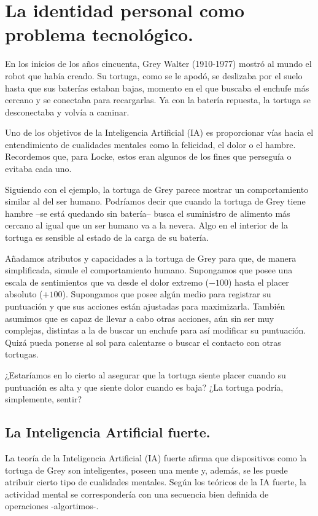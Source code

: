\documentclass[main.tex]{subfiles}
\begin{document}
\chapter{La identidad personal como problema tecnológico.}


En los inicios de los años cincuenta, Grey Walter (1910-1977) mostró al mundo el robot que había creado. Su tortuga, como se le apodó, se deslizaba por el suelo hasta que sus baterías estaban bajas, momento en el que buscaba el enchufe más cercano y se conectaba para recargarlas. Ya con la batería repuesta, la tortuga se desconectaba y volvía a caminar. 

Uno de los objetivos de la Inteligencia Artificial (IA) es proporcionar vías hacia el entendimiento de cualidades mentales como la felicidad, el dolor o el hambre. Recordemos que, para Locke, estos eran algunos de los fines que perseguía o evitaba cada uno.

Siguiendo con el ejemplo, la tortuga de Grey parece mostrar un comportamiento similar al del ser humano. Podríamos decir que  cuando la tortuga de Grey tiene hambre –se está quedando sin batería– busca el suministro de alimento más cercano al igual que un ser humano va a la nevera. Algo en el interior de la tortuga es sensible al estado de la carga de su batería.


Añadamos atributos y capacidades a la tortuga de Grey para que, de manera simplificada, simule el comportamiento humano. Supongamos que posee una escala de sentimientos que va desde el dolor extremo ($-100$) hasta el placer absoluto ($+100$). Supongamos que posee algún medio para registrar su puntuación y que sus acciones están ajustadas para maximizarla. También asumimos que es capaz de llevar a cabo otras acciones, aún sin ser muy complejas, distintas a la de buscar un enchufe para así modificar su puntuación. Quizá pueda ponerse al sol para calentarse o buscar el contacto con otras tortugas.

¿Estaríamos en lo cierto al asegurar que la tortuga siente placer cuando su puntuación es alta y que siente dolor cuando es baja? ¿La tortuga podría, simplemente, sentir?

\section{La Inteligencia Artificial fuerte.}
La teoría de la Inteligencia Artificial (IA) fuerte afirma que dispositivos como la tortuga de Grey son inteligentes, poseen una mente y, además, se les puede atribuir cierto tipo de cualidades mentales. Según los teóricos de la IA fuerte, la actividad mental se correspondería con una secuencia bien definida de operaciones -algortimos-.
\end{document}

